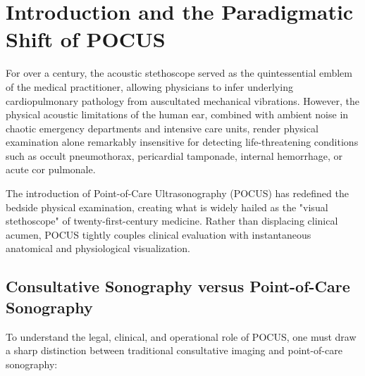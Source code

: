 \documentclass[11pt,a4paper]{article}
\begin{document}
\begin{abstract}
Furthermore, we evaluate advanced Doppler hemodynamics, including stroke volume quantification via the Left Ventricular Outflow Tract Velocity-Time Integral ($\text{LVOT VTI}$), tricuspid annular plane systolic excursion ($\text{TAPSE}$), and systemic venous congestion grading via the \textbf{Venous Excess Ultrasound (VExUS)} score across hepatic, portal, and intrarenal parenchymal venous waveforms. Bedside procedural guidance for vascular access, thoracentesis, paracentesis, and pericardiocentesis is detailed alongside specialized clinical applications: biliary sonography (Murphy's sign), hydronephrosis grading, optic nerve sheath diameter (ONSD) quantification for intracranial pressure surveillance, soft-tissue infections, first-trimester gynecological emergencies (ectopic pregnancy and ovarian torsion), and pediatric acute emergencies (pyloric stenosis, intussusception, and hip effusion). Finally, quality assurance, workflow archiving, competency credentialing, and artificial intelligence integration are addressed.
\end{abstract}

\tableofcontents
\newpage

\section{Introduction and the Paradigmatic Shift of POCUS}
For over a century, the acoustic stethoscope served as the quintessential emblem of the medical practitioner, allowing physicians to infer underlying cardiopulmonary pathology from auscultated mechanical vibrations. However, the physical acoustic limitations of the human ear, combined with ambient noise in chaotic emergency departments and intensive care units, render physical examination alone remarkably insensitive for detecting life-threatening conditions such as occult pneumothorax, pericardial tamponade, internal hemorrhage, or acute cor pulmonale.

The introduction of Point-of-Care Ultrasonography (POCUS) has redefined the bedside physical examination, creating what is widely hailed as the "visual stethoscope" of twenty-first-century medicine. Rather than displacing clinical acumen, POCUS tightly couples clinical evaluation with instantaneous anatomical and physiological visualization.

\subsection{Consultative Sonography versus Point-of-Care Sonography}
To understand the legal, clinical, and operational role of POCUS, one must draw a sharp distinction between traditional consultative imaging and point-of-care sonography:
\end{document}

